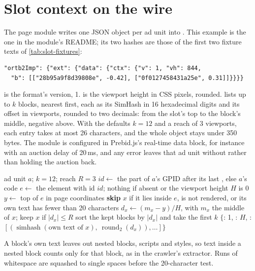 \section{Slot context on the wire}\label{app:slot}

The page module writes one JSON object per ad unit into
. This example is the one in the module's README;
its two hashes are those of the first two fixture texts of
\cref{tab:slot-fixtures}:
\begin{lstlisting}
"ortb2Imp": {"ext": {"data": {"ctx": {"v": 1, "vh": 844,
  "b": [["28b95a9f8d39808e", -0.42], ["0f0127458431a25e", 0.31]]}}}}
\end{lstlisting}
 is the format's version, 1.  is the viewport height in CSS
pixels, rounded.  lists up to $k$ blocks, nearest first, each as its
SimHash in 16 hexadecimal digits and its offset in viewports, rounded to two
decimals: from the slot's top to the block's middle, negative above. With the
defaults $k = 12$ and a reach of 3 viewports, each entry takes at most 26
characters, and the whole object stays under 350 bytes. The module is configured
in Prebid.js's real-time data block, for instance with an auction delay of
20\,ms, and any error leaves that ad unit without  rather than
holding the auction back.

\begin{algorithm}[ht]
\caption{The page module, for one ad unit ( in ).}
\label{alg:slot-module}
\begin{algorithmic}[1]
\Require ad unit $a$; $k = 12$; reach $R = 3$
\State $id \gets$ the part of $a$'s GPID after its last \code{\#}, else $a$'s code
\State $e \gets$ the element with id $id$; \Return nothing if absent or the viewport height $H$ is 0
\State $y \gets$ top of $e$ in page coordinates
  \State \textbf{skip} $x$ if it lies inside $e$, is not rendered, or its own text has fewer than 20 characters
  \State $d_x \gets (m_x - y) / H$, with $m_x$ the middle of $x$; keep $x$ if $|d_x| \le R$
\EndFor
\State sort the kept blocks by $|d_x|$ and take the first $k$
\State \Return $\{$: 1, : $H$, : $[(\operatorname{simhash}(\text{own text of } x),\ \operatorname{round}_2(d_x)), \dots]\}$
\end{algorithmic}
\end{algorithm}

A block's own text leaves out nested blocks, scripts and styles, so text inside
a nested block counts only for that block, as in the crawler's extractor.
Runs of whitespace are squashed to single spaces before the 20-character test.


